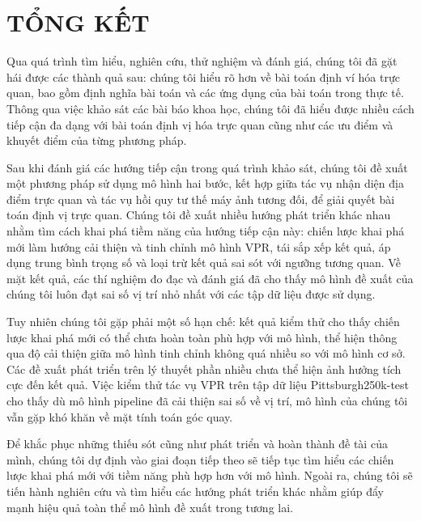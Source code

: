 \chapter{TỔNG KẾT}

Qua quá trình tìm hiểu, nghiên cứu, thử nghiệm và đánh giá, chúng tôi đã gặt hái được các thành quả sau: chúng tôi hiểu rõ hơn về bài toán định ví hóa trực quan, bao gồm định nghĩa bài toán và các ứng dụng của bài toán trong thực tế. Thông qua việc khảo sát các bài báo khoa học, chúng tôi đã hiểu được nhiều cách tiếp cận đa dạng với bài toán định vị hóa trực quan cũng như các ưu điểm và khuyết điểm của từng phương pháp.

Sau khi đánh giá các hướng tiếp cận trong quá trình khảo sát, chúng tôi đề xuất một phương pháp sử dụng mô hình hai bước, kết hợp giữa tác vụ nhận diện địa điểm trực quan và tác vụ hồi quy tư thế máy ảnh tương đối, để giải quyết bài toán định vị trực quan. Chúng tôi đề xuất nhiều hướng phát triển khác nhau nhằm tìm cách khai phá tiềm năng của hướng tiếp cận này: chiến lược khai phá mới làm hướng cải thiện và tinh chỉnh mô hình VPR, tái sắp xếp kết quả, áp dụng trung bình trọng số và loại trừ kết quả sai sót với ngưỡng tương quan. Về mặt kết quả, các thí nghiệm đo đạc và đánh giá đã cho thấy mô hình đề xuất của chúng tôi luôn đạt sai số vị trí nhỏ nhất với các tập dữ liệu được sử dụng.

Tuy nhiên chúng tôi gặp phải một số hạn chế: kết quả kiểm thử cho thấy chiến lược khai phá mới có thể chưa hoàn toàn phù hợp với mô hình, thể hiện thông qua độ cải thiện giữa mô hình tinh chỉnh không quá nhiều so với mô hình cơ sở. Các đề xuất phát triển trên lý thuyết phần nhiều chưa thể hiện ảnh hưởng tích cực đến kết quả. Việc kiểm thử tác vụ VPR trên tập dữ liệu Pittsburgh250k-test cho thấy dù mô hình pipeline đã cải thiện sai số về vị trí, mô hình của chúng tôi vẫn gặp khó khăn về mặt tính toán góc quay.

Để khắc phục những thiếu sót cũng như phát triển và hoàn thành đề tài của mình, chúng tôi dự định vào giai đoạn tiếp theo sẽ tiếp tục tìm hiểu các chiến lược khai phá mới với tiềm năng phù hợp hơn với mô hình. Ngoài ra, chúng tôi sẽ tiến hành nghiên cứu và tìm hiểu các hướng phát triển khác nhằm giúp đẩy mạnh hiệu quả toàn thể mô hình đề xuất trong tương lai.
